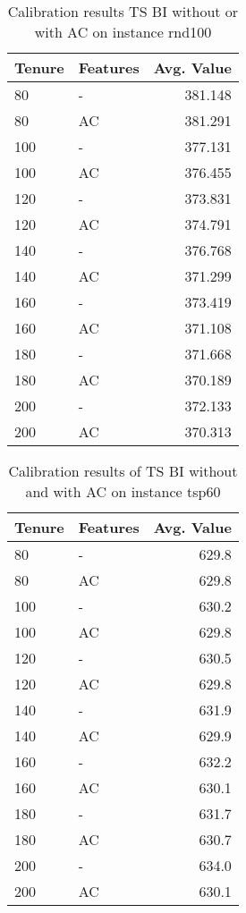 	\begin{table}
		\centering
		\begin{tabular} {l l r}
			\toprule
			\textbf{Tenure} & \textbf{Features} & \textbf{Avg. Value} \\
			\midrule
			 80 & -  & 381.148  \\
			 80 & AC & 381.291 \\
			\midrule
			 100 & - & 377.131 \\
			 100 & AC & 376.455 \\
			\midrule
			 120 & - & 373.831 \\
			 120 & AC & 374.791 \\
			\midrule
			 140 & - & 376.768 \\
			 140 & AC &371.299 \\
			\midrule
			 160 & - & 373.419 \\
			 160 & AC & 371.108 \\
			\midrule
			\rowcolor{LightGray}
			 180 & - & 371.668 \\
			 \rowcolor{LightGray}
			 180 & AC & 370.189 \\
			\midrule
			 200 & - & 372.133 \\
			 200 & AC & 370.313  \\
			\bottomrule
		\end{tabular}
		\caption{\label{tab:TS-calibration100}Calibration results TS BI without or with AC on instance rnd100}
	\end{table}

	\begin{table}
		\centering
		\begin{tabular} {l l r}
			\toprule
			\textbf{Tenure} & \textbf{Features} & \textbf{Avg. Value} \\
			\midrule
			\rowcolor{LightGray}
			80 & -  & 629.8  \\
			\rowcolor{LightGray}
			80 & AC & 629.8 \\
			\midrule
			100 & - & 630.2 \\
			\rowcolor{LightGray}
			100 & AC & 629.8 \\
			\midrule
			120 & - & 630.5 \\
			\rowcolor{LightGray}
			120 & AC & 629.8 \\
			\midrule
			140 & - & 631.9 \\
			140 & AC & 629.9 \\
			\midrule
			160 & - & 632.2 \\
			160 & AC & 630.1 \\
			\midrule
			180 & - & 631.7 \\
			180 & AC & 630.7 \\
			\midrule
			200 & - & 634.0 \\
			200 & AC & 630.1  \\
			\bottomrule
		\end{tabular}
		\caption{\label{tab:TS-calibration60}Calibration results of TS BI without and with AC on instance tsp60}
	\end{table}
	
